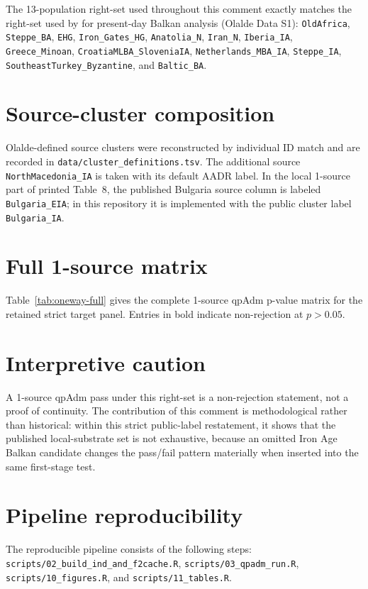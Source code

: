 \documentclass[11pt]{article}
\begin{document}
The 13-population right-set used throughout this comment exactly matches the
right-set used by \citet{Olalde2023} for present-day Balkan analysis (Olalde
Data S1): \nolinkurl{OldAfrica}, \nolinkurl{Steppe_BA}, \nolinkurl{EHG},
\nolinkurl{Iron_Gates_HG}, \nolinkurl{Anatolia_N}, \nolinkurl{Iran_N},
\nolinkurl{Iberia_IA}, \nolinkurl{Greece_Minoan},
\nolinkurl{CroatiaMLBA_SloveniaIA}, \nolinkurl{Netherlands_MBA_IA},
\nolinkurl{Steppe_IA}, \nolinkurl{SoutheastTurkey_Byzantine}, and
\nolinkurl{Baltic_BA}.

\section{Source-cluster composition}
\label{si:sources}

Olalde-defined source clusters were reconstructed by individual ID match and
are recorded in \texttt{data/cluster\_definitions.tsv}. The additional source
\texttt{NorthMacedonia\_IA} is taken with its default AADR label. In the local
1-source part of printed Table~8, the published Bulgaria source column is
labeled \texttt{Bulgaria\_EIA}; in this repository it is implemented with the
public cluster label \texttt{Bulgaria\_IA}.

\section{Full 1-source matrix}

Table~\ref{tab:oneway-full} gives the complete 1-source qpAdm p-value matrix
for the retained strict target panel. Entries in bold indicate non-rejection
at \(p > 0.05\).



\section{Interpretive caution}

A 1-source qpAdm pass under this right-set is a non-rejection statement, not
a proof of continuity. The contribution of this comment is methodological
rather than historical: within this strict public-label restatement, it shows
that the published local-substrate set is not exhaustive, because an omitted
Iron Age Balkan candidate changes the pass/fail pattern materially when
inserted into the same first-stage test.

\section{Pipeline reproducibility}

The reproducible pipeline consists of the following steps:
\nolinkurl{scripts/02_build_ind_and_f2cache.R},
\nolinkurl{scripts/03_qpadm_run.R},
\nolinkurl{scripts/10_figures.R}, and
\nolinkurl{scripts/11_tables.R}.


\end{document}
